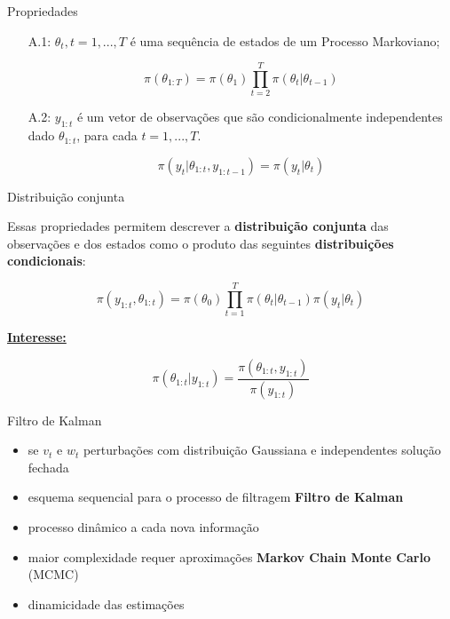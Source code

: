 \documentclass{beamer}
\begin{document}
\begin{frame}{Propriedades}
\begin{center}
\begin{itemize}
\item[A.1:] $\theta_t, t=1,...,T$ é uma sequência de estados de um Processo Markoviano;

$$
\pi(\theta_{1:T}) = \pi(\theta_1) \prod_{t=2}^T \pi(\theta_t|\theta_{t-1}) 
$$

\pause 

\item[A.2:] $y_{1:t}$ é um vetor de observações que são condicionalmente independentes dado $\theta_{1:t}$, para cada $t=1,...,T$.

$$
\pi(y_t|\theta_{1:t},y_{1:t-1}) = \pi(y_t|\theta_{t})
$$

\end{itemize}
\end{center}
\end{frame}


\begin{frame}{Distribuição conjunta}

Essas propriedades permitem descrever a \textbf{distribuição conjunta} das observações e dos estados como o produto das seguintes \textbf{distribuições condicionais}:

$$
\pi(y_{1:t},\theta_{1:t}) = \pi(\theta_0) \prod_{t=1}^T \pi(\theta_t|\theta_{t-1})\pi(y_t|\theta_t) 
$$

\underline{\textbf{Interesse:}}

$$\pi(\theta_{1:t}|y_{1:t}) =  \frac{\pi(\theta_{1:t},y_{1:t})}{\pi(y_{1:t})} $$


\end{frame}


\begin{frame}{Filtro de Kalman}

\begin{itemize}
\item se $v_t$ e $w_t$ perturbações com distribuição Gaussiana e independentes solução fechada
\item esquema sequencial para o processo de filtragem \textbf{Filtro de Kalman} \citep{west}
\item processo dinâmico a cada nova informação 
\item maior complexidade requer aproximações \textbf{Markov Chain Monte Carlo}  (MCMC)
\item dinamicidade das estimações 
\end{itemize}


\end{frame}
\end{document}
